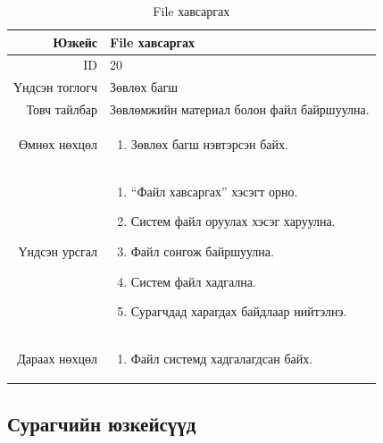 \begin{longtable}{|r|p{11cm}|}
\caption{File хавсаргах}
\label{table:usecase20}\\ \hline
Юзкейс & File хавсаргах \\ \hline
ID & 20 \\ \hline
Үндсэн тоглогч & Зөвлөх багш \\ \hline
Товч тайлбар & Зөвлөмжийн материал
болон файл байршуулна. \\ \hline
Өмнөх нөхцөл &
\begin{enumerate}[nosep]
\item Зөвлөх багш нэвтэрсэн байх.
\end{enumerate} \\ \hline
Үндсэн урсгал &
\begin{enumerate}[nosep]
\item ``Файл хавсаргах'' хэсэгт орно.
\item Систем файл оруулах хэсэг харуулна.
\item Файл сонгож байршуулна.
\item Систем файл хадгална.
\item Сурагчдад харагдах байдлаар нийтэлнэ.
\end{enumerate} \\ \hline
Дараах нөхцөл &
\begin{enumerate}[nosep]
\item Файл системд хадгалагдсан байх.
\end{enumerate} \\ \hline
\end{longtable}

\subsection*{Сурагчийн юзкейсүүд}

